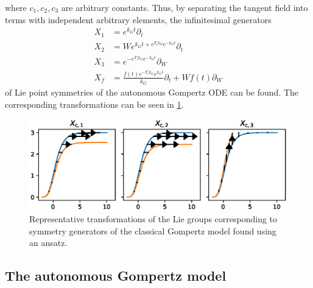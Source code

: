 where \(c_1, c_2, c_3\) are arbitrary constants.
Thus, by separating the tangent field into terms with independent arbitrary elements, the infinitesimal generators
\begin{align}
  X_1 &= e^{k_{G} t} \partial_t \\
  X_2 &= W e^{k_{G} t + e^{T_{i} k_{G}} e^{- k_{G} t}} \partial_t \\
  X_3 &= e^{- e^{T_{i} k_{G}} e^{- k_{G} t}} \partial_W \\
  X_f &= \frac{f{\left(t \right)} e^{- T_{i} k_{G}} e^{k_{G} t}}{k_{G}} \partial_t + W f{\left(t \right)} \partial_W
\end{align}
of Lie point symmetries of the autonomous Gompertz ODE  can be found.
The corresponding transformations can be seen in \cref{fig:gompertz-classical-ansatz}.
\begin{figure}
  \centering
  \includegraphics[width=.96\textwidth]{images/gompertz-classical-ansatz}
  \caption{Representative transformations of the Lie groups corresponding to symmetry generators of the classical Gompertz model found using an ansatz.}
  \label{fig:gompertz-classical-ansatz}
\end{figure}

\subsection{The autonomous Gompertz model}

